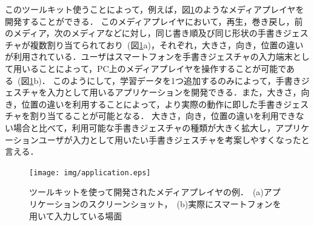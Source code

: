 このツールキット使うことによって，例えば，図\ref{fig:application}のようなメディアプレイヤを開発することができる．
このメディアプレイヤにおいて，再生，巻き戻し，前のメディア，次のメディアなどに対し，同じ書き順及び同じ形状の手書きジェスチャが複数割り当てられており~(図\ref{fig:application}a)，それぞれ，大きさ，向き，位置の違いが利用されている．ユーザはスマートフォンを手書きジェスチャの入力端末として用いることによって，PC上のメディアプレイヤを操作することが可能である~(図\ref{fig:application}b)．
このようにして，学習データを1つ追加するのみによって，手書きジェスチャを入力として用いるアプリケーションを開発できる．また，大きさ，向き，位置の違いを利用することによって，より実際の動作に即した手書きジェスチャを割り当てることが可能となる．
大きさ，向き，位置の違いを利用できない場合と比べて，利用可能な手書きジェスチャの種類が大きく拡大し，アプリケーションユーザが入力として用いたい手書きジェスチャを考案しやすくなったと言える．

\begin{figure} [h!]
	\begin{center}
		\texttt{[image: img/application.eps]}
	\end{center}
	\caption{ツールキットを使って開発されたメディアプレイヤの例．~(a)アプリケーションのスクリーンショット，~(b)実際にスマートフォンを用いて入力している場面}
	\label{fig:application}
\end{figure}
